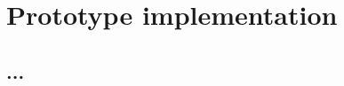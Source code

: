 
\chapter{Prototype implementation}\label{chapter:prototype implementation}

\section{...} 















